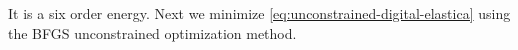 It is a six order energy. Next we minimize \eqref{eq:unconstrained-digital-elastica} using the BFGS unconstrained optimization method.

%
